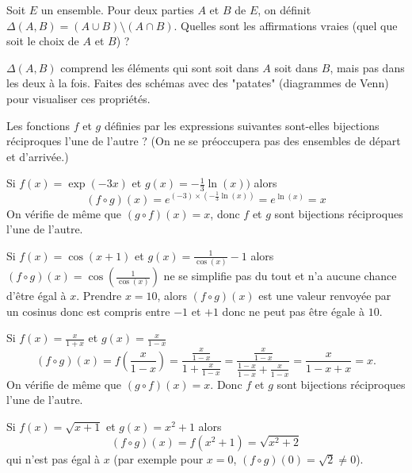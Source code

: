 \begin{question}
Soit $E$ un ensemble. Pour deux parties $A$ et $B$ de $E$, on définit $\Delta(A,B)=(A \cup B)\setminus (A \cap B)$. Quelles sont les affirmations vraies (quel que soit le choix de $A$ et $B$) ?
\begin{answers}
\end{answers}
\begin{explanations} 
$\Delta(A,B)$ comprend les éléments qui sont soit dans $A$ soit dans $B$, mais pas dans les deux à la fois.
Faites des schémas avec des "patates" (diagrammes de Venn) pour visualiser ces propriétés.
\end{explanations}
\end{question}


\begin{question}
Les fonctions $f$ et $g$ définies par les expressions suivantes sont-elles bijections réciproques l'une de l'autre ?
(On ne se préoccupera pas des ensembles de départ et d'arrivée.)
\begin{answers} 
\end{answers}
\begin{explanations}
Si $f(x) = \exp(-3x)$ et $g(x) = -\frac13\ln(x))$ alors 
$$(f \circ g)(x) 
= e^{(-3) \times (-\frac13\ln(x)) }
= e^{ \ln(x)  }
= x$$
On vérifie de même que $(g\circ f)(x)=x$, donc $f$ et $g$ sont bijections réciproques l'une de l'autre.

Si $f(x) = \cos(x+1)$ et $g(x) =  \frac 1{\cos(x)}-1$ alors $(f \circ g)(x) = \cos( \frac 1{\cos(x)})$ ne se simplifie pas du tout et n'a aucune chance d'être égal à $x$. Prendre $x=10$, alors $(f \circ g)(x)$ est une valeur renvoyée par un cosinus donc est compris entre $-1$ et $+1$ donc ne peut pas être égale à $10$.

Si $f(x) = \frac{x}{1+x}$ et $g(x) = \frac{x}{1-x}$
$$(f \circ g)(x) 
= f\left(\frac{x}{1-x} \right)
=  \frac{\frac{x}{1-x}}{1+\frac{x}{1-x}}=\frac{\frac{x}{1-x}}{\frac{1-x}{1-x}+\frac x{1-x}}=\frac x{1-x+x} = x.$$
On vérifie de même que $(g \circ f)(x) = x$. Donc $f$ et $g$ sont bijections réciproques l'une de l'autre.

Si $f(x)= \sqrt{x+1}$ et $g(x) = x^2+1$ alors
$$(f \circ g)(x)
= f\left(x^2+1 \right)
= \sqrt{ x^2+2 }
$$
qui n'est pas égal à $x$ (par exemple pour $x=0$, $(f\circ g)(0)= \sqrt{2} \neq 0$).
\end{explanations}
\end{question}


